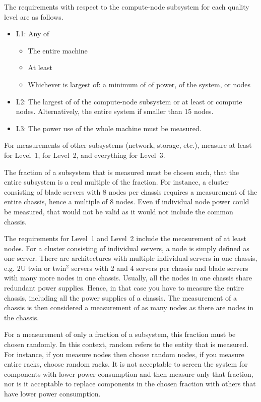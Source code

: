 The requirements with respect to the compute-node subsystem for each quality level are as follows.

\begin{itemize}
\item
L1: Any of
\begin{itemize}
\item The entire machine
\item At least \SpecPowerMaxLOne{}
\item Whichever is largest of: a minimum of \SpecPowerMinLOne{} of power, \SpecFracMinLOne{} of the system, or \SpecMinNodes{} nodes
\end{itemize}

\item
L2: The largest of \SpecFracMinLTwo{} of the compute-node subsystem or at least \SpecPowerMinLTwo{} or \SpecMinNodes{} compute nodes.
Alternatively, the entire system if smaller than 15 nodes.
\item
L3: The power use of the whole machine must be measured.
\end{itemize}

For measurements of other subsystems (network, storage, etc.), measure at least \SpecFracMinLOne{} for Level~1, \SpecFracMinLTwo{} for Level~2, and everything for Level~3.

The fraction of a subsystem that is measured must be chosen such, that the entire subsystem is a real multiple of the fraction.
For instance, a cluster consisting of blade servers with 8 nodes per chassis requires a measurement of the entire chassis, hence a multiple of 8 nodes.
Even if individual node power could be measured, that would not be valid as it would not include the common chassis.

The requirements for Level~1 and Level~2 include the measurement of at least \SpecMinNodes{} nodes.
For a cluster consisting of individual servers, a node is simply defined as one server.
There are architectures with multiple individual servers in one chassis, e.g.
2U twin or twin$^2$ servers with 2 and 4 servers per chassis and blade servers with many more nodes in one chassis.
Usually, all the nodes in one chassis share redundant power supplies.
Hence, in that case you have to measure the entire chassis, including all the power supplies of a chassis.
The measurement of a chassis is then considered a measurement of as many nodes as there are nodes in the chassis.

For a measurement of only a fraction of a subsystem, this fraction must be chosen randomly.
In this context, random refers to the entity that is measured.
For instance, if you measure nodes then choose random nodes, if you measure entire racks, choose random racks.
It is not acceptable to screen the system for components with lower power consumption and then measure only that fraction, nor is it acceptable to replace components in the chosen fraction with others that have lower power consumption.

